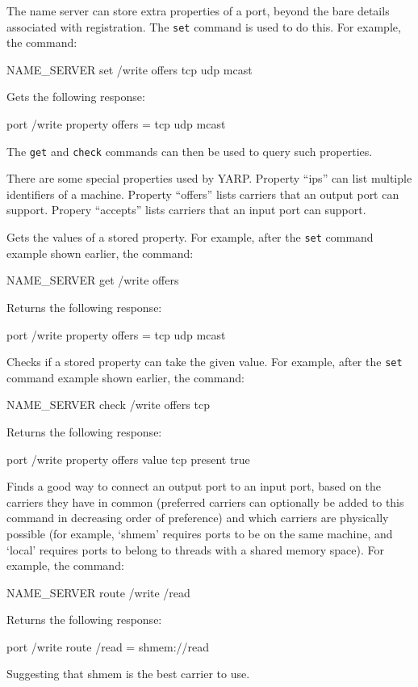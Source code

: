 \newusage{}

The name server can store extra properties of a port, beyond the
bare details associated with registration.  The {\tt set} command
is used to do this.  For example, the command:
\begin{code}
NAME_SERVER set /write offers tcp udp mcast
\end{code}
Gets the following response:
\begin{code}
port /write property offers = tcp udp mcast
\end{code}
The {\tt get} and {\tt check} commands can then be used to query
such properties.

There are some special properties used by YARP.  Property ``ips''
can list multiple identifiers of a machine.  Property ``offers''
lists carriers that an output port can support.  Propery ``accepts''
lists carriers that an input port can support.




\newusage
{}
Gets the values of a stored property. For example, 
after the {\tt set} command example shown earlier, the command:
\begin{code}
NAME_SERVER get /write offers
\end{code}
Returns the following response:
\begin{code}
port /write property offers = tcp udp mcast
\end{code}

\newusage
{}
Checks if a stored property can take the given value. For example, 
after the {\tt set} command example shown earlier, the command:
\begin{code}
NAME_SERVER check /write offers tcp
\end{code}
Returns the following response:
\begin{code}
port /write property offers value tcp present true
\end{code}

\newusage
{}
Finds a good way to connect an output port to an input port, based
on the carriers they have in common (preferred carriers can optionally
be added to this command in decreasing order of preference) and
which carriers are physically possible (for example, `shmem'
requires ports to be on the same machine, and `local' requires
ports to belong to threads with a shared memory space).
For example, the command:
\begin{code}
NAME_SERVER route /write /read
\end{code}
Returns the following response:
\begin{code}
port /write route /read = shmem://read
\end{code}
Suggesting that shmem is the best carrier to use.


